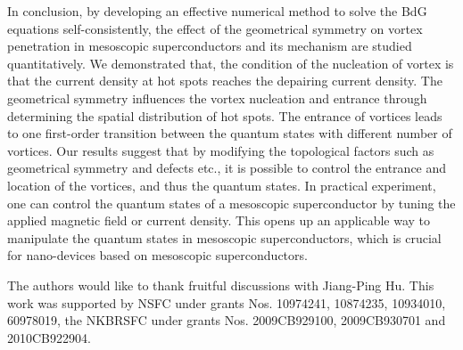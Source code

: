 \documentclass[aps,prl,showpacs,twocolumn]{revtex4}
\begin{document}
In conclusion, by developing an effective numerical method to solve
the BdG equations self-consistently, the effect of the geometrical
symmetry on vortex penetration in mesoscopic superconductors and its
mechanism are studied quantitatively. We demonstrated that, the
condition of the nucleation of vortex is that the current density at
hot spots reaches the depairing current density. The geometrical
symmetry influences the vortex nucleation and entrance through
determining the spatial distribution of hot spots. The entrance of
vortices leads to one first-order transition between the quantum
states with different number of vortices. Our results suggest that
by modifying the topological factors such as geometrical symmetry
and defects etc., it is possible to control the entrance and
location of the vortices, and thus the quantum states. In practical
experiment, one can control the quantum states of a mesoscopic
superconductor by tuning the applied magnetic field or current
density. This opens up an applicable way to manipulate the quantum
states in mesoscopic superconductors, which is crucial for
nano-devices based on mesoscopic superconductors.

The authors would like to thank fruitful discussions with Jiang-Ping
Hu. This work was supported by NSFC under grants Nos. 10974241,
10874235, 10934010, 60978019, the NKBRSFC under grants Nos.
2009CB929100, 2009CB930701 and 2010CB922904.
\end{document}
